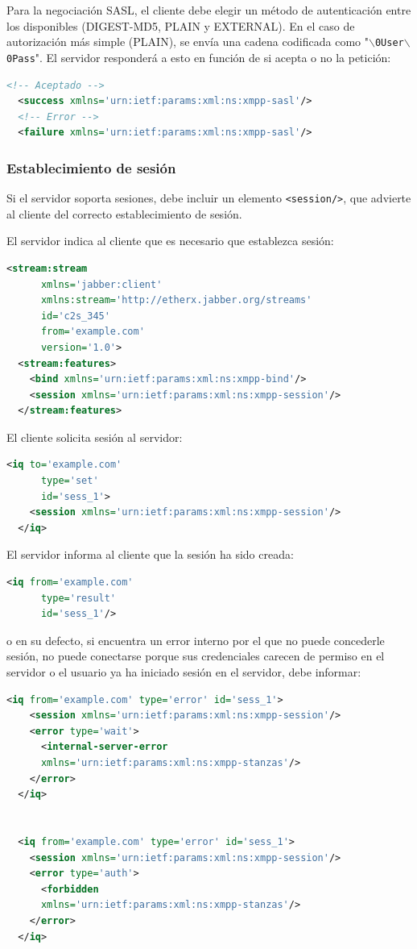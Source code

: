 \documentclass[a4paper, 11pt]{article} %
\begin{document}
	Para la negociación SASL, el cliente debe elegir un método de autenticación entre los disponibles
	(DIGEST-MD5, PLAIN y EXTERNAL). En el caso de autorización más simple (PLAIN), se envía una cadena
	codificada como "\texttt{$\backslash$0User$\backslash$0Pass}". El servidor responderá a esto en 
	función de si acepta o no la petición:
	\begin{lstlisting}[language=XML]
  <!-- Aceptado -->
  <success xmlns='urn:ietf:params:xml:ns:xmpp-sasl'/>
  <!-- Error -->
  <failure xmlns='urn:ietf:params:xml:ns:xmpp-sasl'/>
	\end{lstlisting}
	
      \subsubsection{Establecimiento de sesión}
	Si el servidor soporta sesiones, debe incluir un elemento \texttt{<session/>}, que advierte al cliente del 
	correcto establecimiento de sesión.
	
	El servidor indica al cliente que es necesario que establezca sesión:
  \begin{lstlisting}[language=XML]
  <stream:stream
      xmlns='jabber:client'
      xmlns:stream='http://etherx.jabber.org/streams'
      id='c2s_345'
      from='example.com'
      version='1.0'>
  <stream:features>
    <bind xmlns='urn:ietf:params:xml:ns:xmpp-bind'/>
    <session xmlns='urn:ietf:params:xml:ns:xmpp-session'/>
  </stream:features>
  \end{lstlisting}

      El cliente solicita sesión al servidor:
  \begin{lstlisting}[language=XML]
  <iq to='example.com'
      type='set'
      id='sess_1'>
    <session xmlns='urn:ietf:params:xml:ns:xmpp-session'/>
  </iq>
  \end{lstlisting}

      El servidor informa al cliente que la sesión ha sido creada:
  \begin{lstlisting}[language=XML]   
  <iq from='example.com'
      type='result'
      id='sess_1'/>
  \end{lstlisting}
      o en su defecto, si encuentra un error interno por el que no puede concederle sesión, no puede conectarse porque
      sus credenciales carecen de permiso en el servidor o el usuario ya ha iniciado sesión en el servidor, debe informar:
  \begin{lstlisting}[language=XML]
  <iq from='example.com' type='error' id='sess_1'>
    <session xmlns='urn:ietf:params:xml:ns:xmpp-session'/>
    <error type='wait'>
      <internal-server-error
	  xmlns='urn:ietf:params:xml:ns:xmpp-stanzas'/>
    </error>
  </iq>


  <iq from='example.com' type='error' id='sess_1'>
    <session xmlns='urn:ietf:params:xml:ns:xmpp-session'/>
    <error type='auth'>
      <forbidden
	  xmlns='urn:ietf:params:xml:ns:xmpp-stanzas'/>
    </error>
  </iq>
  \end{lstlisting}
\end{document}
